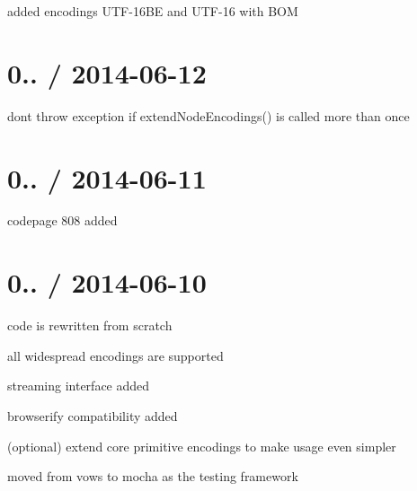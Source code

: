 \begin{DoxyItemize}
\item added encodings U\+T\+F-\/16\+BE and U\+T\+F-\/16 with B\+OM
\end{DoxyItemize}

\section*{0.. / 2014-\/06-\/12}


\begin{DoxyItemize}
\item don\textquotesingle{}t throw exception if {\ttfamily extend\+Node\+Encodings()} is called more than once
\end{DoxyItemize}

\section*{0.. / 2014-\/06-\/11}


\begin{DoxyItemize}
\item codepage 808 added
\end{DoxyItemize}

\section*{0.. / 2014-\/06-\/10}


\begin{DoxyItemize}
\item code is rewritten from scratch
\item all widespread encodings are supported
\item streaming interface added
\item browserify compatibility added
\item (optional) extend core primitive encodings to make usage even simpler
\item moved from vows to mocha as the testing framework 
\end{DoxyItemize}
